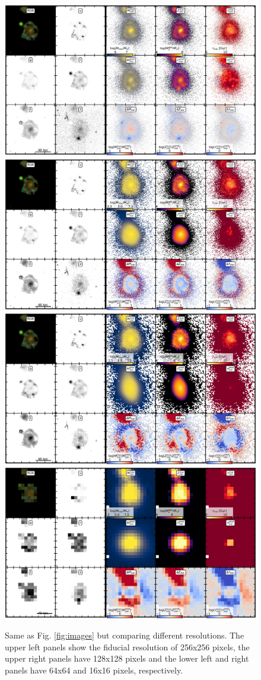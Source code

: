 \documentclass[useAMS,usenatbib]{mnras}
\begin{document}
\begin{figure}
\vspace{-.25cm}
\begin{center}
\includegraphics[width=.49\textwidth]{./plots/2096_masked.pdf}
\includegraphics[width=.49\textwidth]{./plots/2096_masked_2.pdf}
\includegraphics[width=.49\textwidth]{./plots/2096_masked_4.pdf}
\includegraphics[width=.49\textwidth]{./plots/2096_masked_16.pdf}
\end{center}
\vspace{-.35cm}
\caption{Same as Fig. \ref{fig:images} but comparing different resolutions. The upper left panels show the fiducial resolution of 256x256 pixels, the upper right panels have 128x128 pixels and the lower left and right panels have 64x64 and 16x16 pixels, respectively.
}
\label{fig:app_res_comp}
\end{figure}
\end{document}
